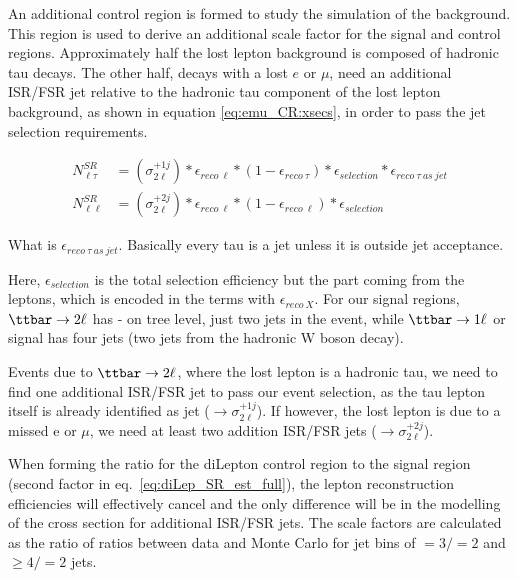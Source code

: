An additional control region is formed to study the simulation of the \ttjets background.  This region is used to derive an additional scale factor for the signal and control regions.  Approximately half the lost lepton background is composed of hadronic tau decays.  The other half, decays with a lost $e$ or $\mu$, need an additional ISR/FSR jet relative to the hadronic tau component of the lost lepton background, as shown in equation \ref{eq:emu_CR:xsecs}, in order to pass the jet selection requirements. 

\begin{align} \label{eq:emu_CR:xsecs}
N^{SR}_{\ell\tau} &= (\sigma^{+1j}_{2\ell})\ast\epsilon_{reco~\ell}\ast(1-\epsilon_{reco~\tau})\ast\epsilon_{selection}\ast\epsilon_{reco~\tau~as~jet} \\
N^{SR}_{\ell\ell} &= (\sigma^{+2j}_{2\ell})\ast\epsilon_{reco~\ell}\ast(1-\epsilon_{reco~\ell})\ast\epsilon_{selection}
\end{align}

{\color{red} What is $\epsilon_{reco~\tau~as~jet}$. Basically every tau is a jet unless it is outside jet acceptance}.

Here, $\epsilon_{selection}$ is the total selection efficiency but the part coming from the leptons, which is encoded in the terms with $\epsilon_{reco~X}$.
For our signal regions, $\ttbar\to2\ell$ has - on tree level, just two jets in the event, while $\ttbar\to1\ell$ or signal has four jets (two jets from the hadronic W boson decay).

Events due to $\ttbar\to2\ell$, where the lost lepton is a hadronic tau, we need to find one additional ISR/FSR jet to pass our event selection, as the tau lepton itself is already identified as jet ($\rightarrow \sigma^{+1j}_{2\ell}$).
If however, the lost lepton is due to a missed e or $\mu$, we need at least two addition ISR/FSR jets ($\rightarrow \sigma^{+2j}_{2\ell}$).

When forming the ratio for the diLepton control region to the signal region (second factor in eq.~\ref{eq:diLep_SR_est_full}), 
the lepton reconstruction efficiencies will effectively cancel %
and the only difference will be in the modelling of the cross section for additional ISR/FSR jets.  The scale factors are calculated as the 
ratio of ratios between data and Monte Carlo for jet bins of $=3/=2$ and $\ge4/=2$ jets.


